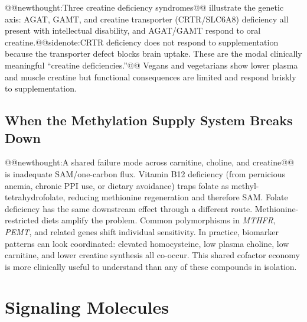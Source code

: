 \documentclass{tufte-handout}
\makeatletter
\def\newthought#1{@@newthought:#1@@}
\def\sidenote#1{@@sidenote:#1@@}
\makeatother
\begin{document}
\newthought{Three creatine deficiency syndromes} illustrate the genetic axis: AGAT, GAMT, and creatine transporter (CRTR/SLC6A8) deficiency all present with intellectual disability, and AGAT/GAMT respond to oral creatine.\sidenote{CRTR deficiency does not respond to supplementation because the transporter defect blocks brain uptake. These are the modal clinically meaningful ``creatine deficiencies.''} Vegans and vegetarians show lower plasma and muscle creatine but functional consequences are limited and respond briskly to supplementation.

\subsection{When the Methylation Supply System Breaks Down}
\newthought{A shared failure mode across carnitine, choline, and creatine} is inadequate SAM/one-carbon flux. Vitamin B12 deficiency (from pernicious anemia, chronic PPI use, or dietary avoidance) traps folate as methyl-tetrahydrofolate, reducing methionine regeneration and therefore SAM. Folate deficiency has the same downstream effect through a different route. Methionine-restricted diets amplify the problem. Common polymorphisms in \emph{MTHFR}, \emph{PEMT}, and related genes shift individual sensitivity. In practice, biomarker patterns can look coordinated: elevated homocysteine, low plasma choline, low carnitine, and lower creatine synthesis all co-occur. This shared cofactor economy is more clinically useful to understand than any of these compounds in isolation.

\section{Signaling Molecules}\label{sec:signaling}
\end{document}
